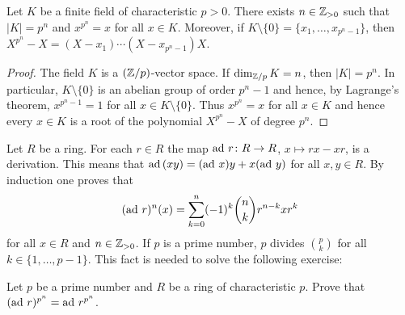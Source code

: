

\begin{lemma}
	\label{lem:k_finito}
	Let $K$ be a finite field of characteristic $p>0$. There exists 
	$n\in\mathbb{Z}_{>0}$ such that $|K|=p^n$ and $x^{p^n}=x$ for all $x\in K$. Moreover, 
	if $K\setminus\{0\}=\{x_1,\dots,x_{p^n-1}\}$, then 
	$X^{p^n}-X=(X-x_1)\cdots(X-x_{p^n-1})X$. 
\end{lemma}

\begin{proof}
	The field $K$ is a $(\mathbb{Z}/p)$-vector space. If $\dim_{\mathbb{Z}/p} K=n$, then 
	$|K|=p^n$. In particular, $K\setminus\{0\}$ is an abelian
	group of order $p^{n}-1$ and hence, by Lagrange's theorem, 
	$x^{p^n-1}=1$ for all $x\in K\setminus\{0\}$. Thus $x^{p^n}=x$ for all $x\in K$
	and hence every $x\in K$ is a root of the polynomial 
	$X^{p^n}-X$ of degree $p^n$. 
\end{proof}

Let $R$ be a ring. For each $r\in R$ the map $\operatorname{ad}\,r\colon
R\to R$, $x\mapsto rx-xr$, is a derivation. This means that
$\operatorname{ad}\,(xy)=(\operatorname{ad}\,x)y+x(\operatorname{ad}\,y)$ for all $x,y\in R$. 
By induction one proves that 
\begin{equation}
	\label{eq:Leibniz}
	(\operatorname{ad}\,r)^n(x)=\sum_{k=0}^n(-1)^k\binom{n}{k}r^{n-k}xr^k
\end{equation}
for all $x\in R$ and $n\in\mathbb{Z}_{>0}$. If $p$ 
is a prime number, 
$p$ divides $\binom{p}{k}$ for all $k\in\{1,\dots,p-1\}$. This fact
is needed to solve the following exercise:

\begin{exercise}
    Let $p$ be a prime number and $R$ be a ring of characteristic $p$. 
    Prove that $(\operatorname{ad}\,r)^{p^n}=\operatorname{ad}\,r^{p^n}$. 
\end{exercise}

